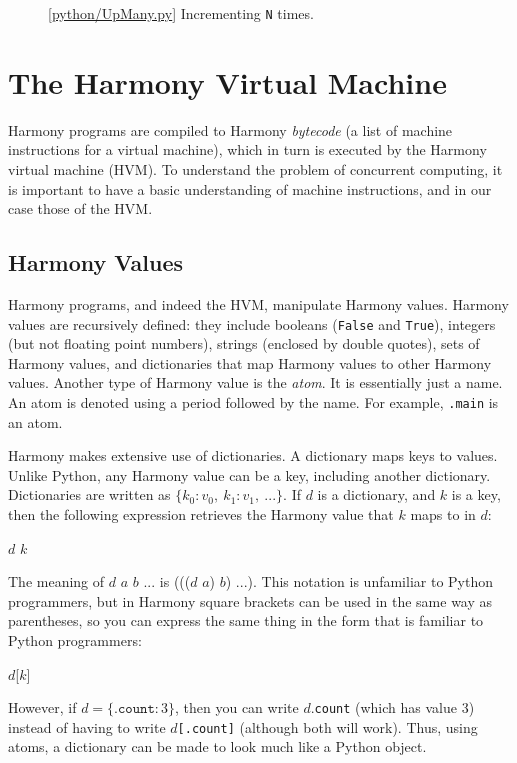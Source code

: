 \documentclass{report}
\newcommand{\harmonylink}[1]{%
[\href{https://harmony.cs.cornell.edu/#1}{\underline{#1}}]%
}
\newenvironment{code}{
\tcolorbox
}{
\endtcolorbox
}
\begin{document}
\begin{figure}
\begin{code}
\end{code}
\caption{\harmonylink{python/UpMany.py} Incrementing \texttt{N} times.}
\label{fig:incmany}
\end{figure}

\chapter{The Harmony Virtual Machine}
\label{ch:harmonymachine}
%

Harmony programs are compiled to Harmony \emph{bytecode}
%
(a list of machine instructions for a virtual machine),
which in turn is executed by the Harmony virtual machine (HVM).
%
%
%
To understand the problem of concurrent computing, it
is important to have a basic understanding of machine instructions,
and in our case those of the HVM.

\section*{Harmony Values}

Harmony programs, and indeed the HVM,  manipulate Harmony values.
Harmony values are recursively defined:
they include booleans (\texttt{False} and \texttt{True}),
integers (but not floating point numbers),
strings (enclosed by double quotes),
sets of Harmony values,
and dictionaries
%
that map Harmony values to other Harmony values.
%
Another type of Harmony value is the \emph{atom}.
%
It is essentially
just a name.  An atom is denoted using a period followed by the
name.  For example, \texttt{.main} is an atom.

Harmony makes extensive use of dictionaries.
A dictionary maps keys to values.
Unlike Python, any Harmony value can be a key, including another
dictionary.
Dictionaries are written as
$\{ k_0: v_0, ~ k_1: v_1, ~ ... \}$.
If $d$ is a dictionary, and $k$ is a key, then the
following expression retrieves the Harmony value that $k$ maps to in $d$:
\begin{code}
$d$ $k$
\end{code}
The meaning of $d$ $a$ $b$ $...$ is ((($d$ $a$) $b$) $...$).
This notation is unfamiliar to Python programmers,
but in Harmony square brackets can be used
in the same way as parentheses, so you can express the same thing in the form
that is familiar to Python programmers:
\begin{code}
$d$[$k$]
\end{code}
However, if $d = \{ \mathtt{.count}: 3 \}$, then you can write
$d$.\texttt{count} (which has value 3) instead of having to write
$d$\texttt{[.count]} (although both will work).
Thus, using atoms, a dictionary can be made to look much like a Python object.
\end{document}
